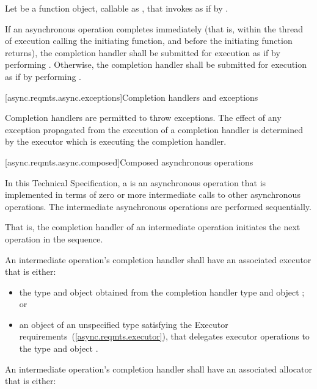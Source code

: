 \pnum
Let  be a function object, callable as , that invokes  as if by .

\pnum
If an asynchronous operation completes immediately (that is, within the thread of execution calling the initiating function, and before the initiating function returns), the completion handler shall be submitted for execution as if by performing . Otherwise, the completion handler shall be submitted for execution as if by performing .



[async.reqmts.async.exceptions]{Completion handlers and exceptions}

\pnum
 Completion handlers are permitted to throw exceptions. The effect of any exception propagated from the execution of a completion handler is determined by the executor which is executing the completion handler.



[async.reqmts.async.composed]{Composed asynchronous operations}

\pnum
In this Technical Specification, a  is an asynchronous operation that is implemented in terms of zero or more intermediate calls to other asynchronous operations. The intermediate asynchronous operations are performed sequentially. \begin{note} That is, the completion handler of an intermediate operation initiates the next operation in the sequence. \end{note}

An intermediate operation's completion handler shall have an associated executor that is either:

\begin{itemize}
\item
the type  and object  obtained from the completion handler type  and object ; or

\item
an object of an unspecified type satisfying the Executor requirements~(\ref{async.reqmts.executor}), that delegates executor operations to the type  and object .
\end{itemize}

An intermediate operation's completion handler shall have an associated allocator that is either:

